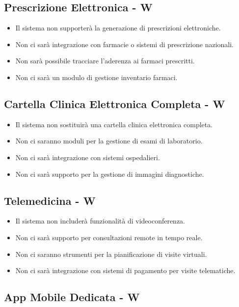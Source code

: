 \documentclass[12pt,a4paper,oneside]{report}
\begin{document}
\subsection{Prescrizione Elettronica - W}

\begin{itemize}
    \item Il sistema non supporterà la generazione di prescrizioni elettroniche.
    \item Non ci sarà integrazione con farmacie o sistemi di prescrizione nazionali.
    \item Non sarà possibile tracciare l'aderenza ai farmaci prescritti.
    \item Non ci sarà un modulo di gestione inventario farmaci.
\end{itemize}

\subsection{Cartella Clinica Elettronica Completa  - W}

\begin{itemize}
    \item Il sistema non sostituirà una cartella clinica elettronica completa.
    \item Non ci saranno moduli per la gestione di esami di laboratorio.
    \item Non ci sarà integrazione con sistemi ospedalieri.
    \item Non ci sarà supporto per la gestione di immagini diagnostiche.
\end{itemize}

\subsection{Telemedicina  - W}

\begin{itemize}
    \item Il sistema non includerà funzionalità di videoconferenza.
    \item Non ci sarà supporto per consultazioni remote in tempo reale.
    \item Non ci saranno strumenti per la pianificazione di visite virtuali.
    \item Non ci sarà integrazione con sistemi di pagamento per visite telematiche.
\end{itemize}

\subsection{App Mobile Dedicata  - W}
\end{document}
